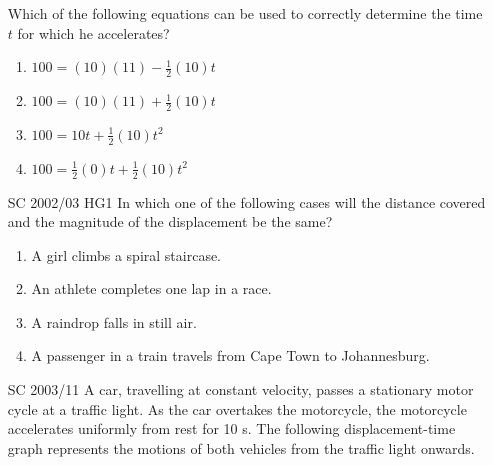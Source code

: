 \begin{enumerate}[noitemsep, label=\textbf{\arabic*}. ]
Which of the following equations can be used to correctly determine the time \begin{math}t\end{math} for which he accelerates?
\label{m38796*id81842}\begin{enumerate}[noitemsep, label=\textbf{\alph*}. ] 
            \label{m38796*uid193}\item \begin{math}100=\left(10\right)\left(11\right)-\frac{1}{2}\left(10\right)t\end{math}\label{m38796*uid194}\item \begin{math}100=\left(10\right)\left(11\right)+\frac{1}{2}\left(10\right)t\end{math}\label{m38796*uid195}\item \begin{math}100=10t+\frac{1}{2}\left(10\right){t}^{2}\end{math}\label{m38796*uid196}\item \begin{math}100=\frac{1}{2}\left(0\right)t+\frac{1}{2}\left(10\right){t}^{2}\end{math}\end{enumerate}
                \label{m38796*uid197}\item [SC 2002/03 HG1]
In which one of the following cases will the distance covered and the magnitude of the displacement be the same?
\label{m38796*id82078}\begin{enumerate}[noitemsep, label=\textbf{\alph*}. ] 
            \label{m38796*uid198}\item A girl climbs a spiral staircase.
\label{m38796*uid199}\item An athlete completes one lap in a race.
\label{m38796*uid200}\item A raindrop falls in still air.
\label{m38796*uid201}\item A passenger in a train travels from Cape Town to Johannesburg.
\end{enumerate}
                \label{m38796*uid202}\item [SC 2003/11] A car, travelling at constant velocity, passes a stationary motor cycle at a traffic light. As the car overtakes the motorcycle, the motorcycle accelerates uniformly from rest for 10 s. The following displacement-time graph represents the motions of both vehicles from the traffic light onwards.

    \setcounter{subfigure}{0}



\end{enumerate}
